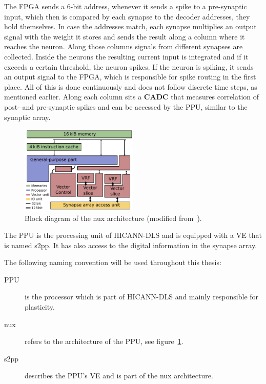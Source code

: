 The \ac{FPGA} sends a 6-bit address, whenever it sends a spike to a pre-synaptic input, which then is compared by each synapse to the decoder addresses, they hold themselves.
In case the addresses match, each synapse multiplies an output signal with the weight it stores and sends the result along a column where it reaches the neuron.
Along those columns signals from different synapses are collected.
Inside the neurons the resulting current input is integrated and if it exceeds a certain threshold, the neuron spikes.
If the neuron is spiking, it sends an output signal to the FPGA, which is responsible for spike routing in the first place.
All of this is done continuously and does not follow discrete time steps, as mentioned earlier.
Along each column sits a \textbf{\ac{CADC}} that measures correlation of post- and pre-synaptic spikes and can be accessed by the \ac{PPU}, similar to the synaptic array.
\begin{figure}
\captionsetup{format=plain, indention=.6cm, labelsep=newline,singlelinecheck=false}
    \centering
    \includegraphics[width=0.5\textwidth]{pictures/nux.pdf}
    \caption{\label{fig:nux} Block diagram of the nux architecture (modified from~\citeauthor{PPU}).}
\end{figure}
The \ac{PPU} is the processing unit of \ac{HICANN-DLS} and is equipped with a \ac{VE} that is named \ac{s2pp}.
It has also access to the digital information in the synapse array.

The following naming convention will be used throughout this thesis:
\begin{description}
    \item[\ac{PPU}] is the processor which is part of \ac{HICANN-DLS} and mainly responsible for plasticity.
    \item[nux] refers to the architecture of the \ac{PPU}, see figure~\ref{fig:nux}.
    \item[\ac{s2pp}] describes the \ac{PPU}'s \ac{VE} and is part of the nux architecture.
\end{description}

